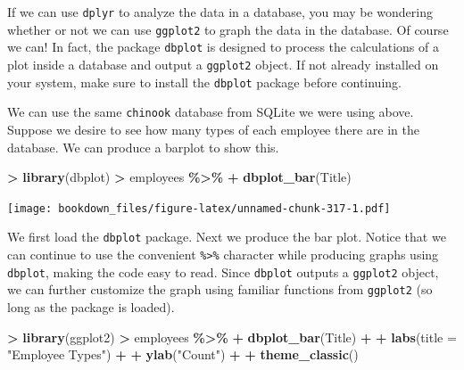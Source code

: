 \documentclass[
]{krantz}
\makeatletter
\newenvironment{Shaded}{\begin{snugshade}}{\end{snugshade}}
\newcommand{\DataTypeTok}[1]{\textcolor[rgb]{0.27,0.27,0.27}{#1}}
\newcommand{\KeywordTok}[1]{\textcolor[rgb]{0.27,0.27,0.27}{\textbf{#1}}}
\newcommand{\NormalTok}[1]{#1}
\newcommand{\OperatorTok}[1]{\textcolor[rgb]{0.43,0.43,0.43}{\textbf{#1}}}
\newcommand{\StringTok}[1]{\textcolor[rgb]{0.5,0.5,0.5}{#1}}
\newenvironment{kframe}{%
\medskip{}
\setlength{\fboxsep}{.8em}
 \def\at@end@of@kframe{}%
 \ifinner\ifhmode%
  \def\at@end@of@kframe{\end{minipage}}%
  \begin{minipage}{\columnwidth}%
 \fi\fi%
 \def\FrameCommand##1{\hskip\@totalleftmargin \hskip-\fboxsep
 \colorbox{shadecolor}{##1}\hskip-\fboxsep
     \hskip-\linewidth \hskip-\@totalleftmargin \hskip\columnwidth}%
 \MakeFramed {\advance\hsize-\width
   \@totalleftmargin\z@ \linewidth\hsize
   \@setminipage}}%
 {\par\unskip\endMakeFramed%
 \at@end@of@kframe}
\renewenvironment{Shaded}{\begin{kframe}}{\end{kframe}}
\makeatother
\begin{document}
If we can use \texttt{dplyr} to analyze the data in a database, you may be wondering whether or not we can use \texttt{ggplot2} to graph the data in the database. Of course we can! In fact, the package \texttt{dbplot} is designed to process the calculations of a plot inside a database and output a \texttt{ggplot2} object. If not already installed on your system, make sure to install the \texttt{dbplot} package before continuing.

We can use the same \texttt{chinook} database from SQLite we were using above. Suppose we desire to see how many types of each employee there are in the database. We can produce a barplot to show this.

\begin{Shaded}
\begin{Highlighting}[]
\OperatorTok{\textgreater{}}\StringTok{ }\KeywordTok{library}\NormalTok{(dbplot)}
\OperatorTok{\textgreater{}}\StringTok{ }\NormalTok{employees }\OperatorTok{\%\textgreater{}\%}\StringTok{ }
\OperatorTok{+}\StringTok{   }\KeywordTok{dbplot\_bar}\NormalTok{(Title)}
\end{Highlighting}
\end{Shaded}

\texttt{[image: bookdown\_files/figure-latex/unnamed-chunk-317-1.pdf]}

We first load the \texttt{dbplot} package. Next we produce the bar plot. Notice that we can continue to use the convenient \texttt{\%\textgreater{}\%} character while producing graphs using \texttt{dbplot}, making the code easy to read. Since \texttt{dbplot} outputs a \texttt{ggplot2} object, we can further customize the graph using familiar functions from \texttt{ggplot2} (so long as the package is loaded).

\begin{Shaded}
\begin{Highlighting}[]
\OperatorTok{\textgreater{}}\StringTok{ }\KeywordTok{library}\NormalTok{(ggplot2)}
\OperatorTok{\textgreater{}}\StringTok{ }\NormalTok{employees }\OperatorTok{\%\textgreater{}\%}\StringTok{ }
\OperatorTok{+}\StringTok{   }\KeywordTok{dbplot\_bar}\NormalTok{(Title) }\OperatorTok{+}\StringTok{ }
\OperatorTok{+}\StringTok{   }\KeywordTok{labs}\NormalTok{(}\DataTypeTok{title =} \StringTok{"Employee Types"}\NormalTok{) }\OperatorTok{+}\StringTok{ }
\OperatorTok{+}\StringTok{   }\KeywordTok{ylab}\NormalTok{(}\StringTok{"Count"}\NormalTok{) }\OperatorTok{+}\StringTok{ }
\OperatorTok{+}\StringTok{   }\KeywordTok{theme\_classic}\NormalTok{()}
\end{Highlighting}
\end{Shaded}
\end{document}
